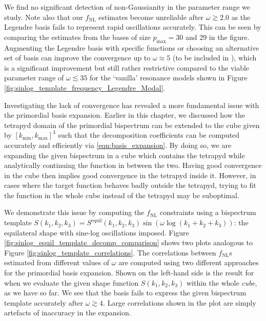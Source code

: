 We find no significant detection of non-Gaussianity in the parameter range we study. Note also that our $f_\text{NL}$ estimates become unreliable after $\omega\gtrsim2.0$ as the Legendre basis fails to represent rapid oscillations accurately. This can be seen by comparing the estimates from the bases of size $p_\text{max}=30$ and $29$ in the figure. Augmenting the Legendre basis with specific functions or choosing an alternative set of basis \cite{Clarke2021} can improve the convergence up to $\omega\approx5$ (to be included in \cite{Sohn2021inprep}), which is a significant improvement but still rather restrictive compared to the viable parameter range of $\omega\lesssim 35$ for the `vanilla' resonance models shown in Figure \ref{fig:sinlog_template_frequency_Legendre_Modal}.

Investigating the lack of convergence has revealed a more fundamental issue with the primordial basis expansion. Earlier in this chapter, we discussed how the tetrapyd domain of the primordial bispectrum can be extended to the cube given by $[k_\text{min},k_\text{max}]^3$ such that the decomposition coefficients can be computed accurately and efficiently via \eqref{eqn:basis_expansion}. By doing so, we are expanding the given bispectrum in a cube which contains the tetrapyd while analytically continuing the function in between the two. Having good convergence in the cube then implies good convergence in the tetrapyd inside it. However, in cases where the target function behaves badly outside the tetrapyd, trying to fit the function in the whole cube instead of the tetrapyd may be suboptimal.

We demonstrate this issue by computing the $f_\text{NL}$ constraints using a bispectrum template $S(k_1,k_2,k_3) = S^\text{equil}(k_1,k_2,k_3) \sin(\omega \log(k_1+k_2+k_3))$: the equilateral shape with sine-log oscillations imposed. Figure \ref{fig:sinlog_equil_template_decomp_comparison} shows two plots analogous to Figure \ref{fig:sinlog_template_correlations}. The correlations between $f_\text{NL}$s estimated from different values of $\omega$ are computed using two different approaches for the primordial basis expansion. Shown on the left-hand side is the result for when we evaluate the given shape function $S(k_1,k_2,k_3)$ within the whole \textit{cube}, as we have so far. We see that the basis fails to express the given bispectrum template accurately after $\omega\gtrsim4$. Large correlations shown in the plot are simply artefacts of inaccuracy in the expansion.

